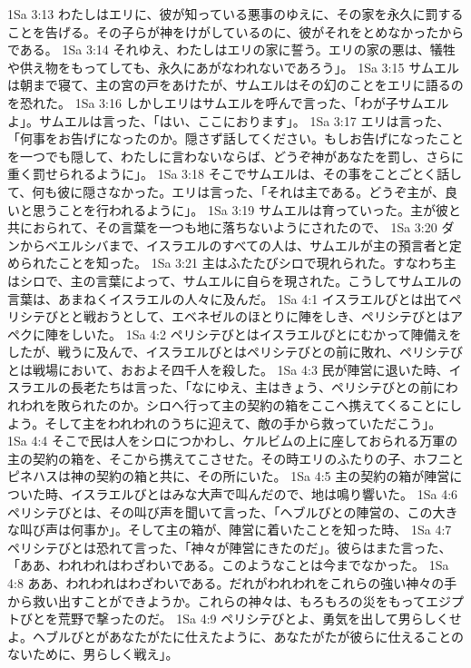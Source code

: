 1Sa 3:13  わたしはエリに、彼が知っている悪事のゆえに、その家を永久に罰することを告げる。その子らが神をけがしているのに、彼がそれをとめなかったからである。
1Sa 3:14  それゆえ、わたしはエリの家に誓う。エリの家の悪は、犠牲や供え物をもってしても、永久にあがなわれないであろう」。
1Sa 3:15  サムエルは朝まで寝て、主の宮の戸をあけたが、サムエルはその幻のことをエリに語るのを恐れた。
1Sa 3:16  しかしエリはサムエルを呼んで言った、「わが子サムエルよ」。サムエルは言った、「はい、ここにおります」。
1Sa 3:17  エリは言った、「何事をお告げになったのか。隠さず話してください。もしお告げになったことを一つでも隠して、わたしに言わないならば、どうぞ神があなたを罰し、さらに重く罰せられるように」。
1Sa 3:18  そこでサムエルは、その事をことごとく話して、何も彼に隠さなかった。エリは言った、「それは主である。どうぞ主が、良いと思うことを行われるように」。
1Sa 3:19  サムエルは育っていった。主が彼と共におられて、その言葉を一つも地に落ちないようにされたので、
1Sa 3:20  ダンからベエルシバまで、イスラエルのすべての人は、サムエルが主の預言者と定められたことを知った。
1Sa 3:21  主はふたたびシロで現れられた。すなわち主はシロで、主の言葉によって、サムエルに自らを現された。こうしてサムエルの言葉は、あまねくイスラエルの人々に及んだ。
1Sa 4:1  イスラエルびとは出てペリシテびとと戦おうとして、エベネゼルのほとりに陣をしき、ペリシテびとはアペクに陣をしいた。
1Sa 4:2  ペリシテびとはイスラエルびとにむかって陣備えをしたが、戦うに及んで、イスラエルびとはペリシテびとの前に敗れ、ペリシテびとは戦場において、おおよそ四千人を殺した。
1Sa 4:3  民が陣営に退いた時、イスラエルの長老たちは言った、「なにゆえ、主はきょう、ペリシテびとの前にわれわれを敗られたのか。シロへ行って主の契約の箱をここへ携えてくることにしよう。そして主をわれわれのうちに迎えて、敵の手から救っていただこう」。
1Sa 4:4  そこで民は人をシロにつかわし、ケルビムの上に座しておられる万軍の主の契約の箱を、そこから携えてこさせた。その時エリのふたりの子、ホフニとピネハスは神の契約の箱と共に、その所にいた。
1Sa 4:5  主の契約の箱が陣営についた時、イスラエルびとはみな大声で叫んだので、地は鳴り響いた。
1Sa 4:6  ペリシテびとは、その叫び声を聞いて言った、「ヘブルびとの陣営の、この大きな叫び声は何事か」。そして主の箱が、陣営に着いたことを知った時、
1Sa 4:7  ペリシテびとは恐れて言った、「神々が陣営にきたのだ」。彼らはまた言った、「ああ、われわれはわざわいである。このようなことは今までなかった。
1Sa 4:8  ああ、われわれはわざわいである。だれがわれわれをこれらの強い神々の手から救い出すことができようか。これらの神々は、もろもろの災をもってエジプトびとを荒野で撃ったのだ。
1Sa 4:9  ペリシテびとよ、勇気を出して男らしくせよ。ヘブルびとがあなたがたに仕えたように、あなたがたが彼らに仕えることのないために、男らしく戦え」。
